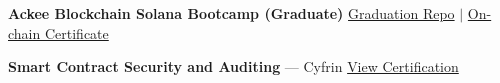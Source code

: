 \begin{zitemize}
  \item \textbf{Ackee Blockchain Solana Bootcamp (Graduate)} \hfill \href{https://github.com/JustUzair/ackee-solana-s7-bootcamp}{Graduation Repo} $|$ \href{https://solscan.io/tx/5Qd3tXZGAdWKEcf3pb1YnRmC8CNEDhET6WWjkuLa7d1V1bRMp8M4trDtsGxMEudT5FGuUMP3cfYr9ujFPXPtoHd8}{On-chain Certificate}
  \item \textbf{Smart Contract Security and Auditing} --- Cyfrin \hfill \href{https://www.linkedin.com/in/0xjustuzair/details/certifications/}{View Certification}
\end{zitemize}
